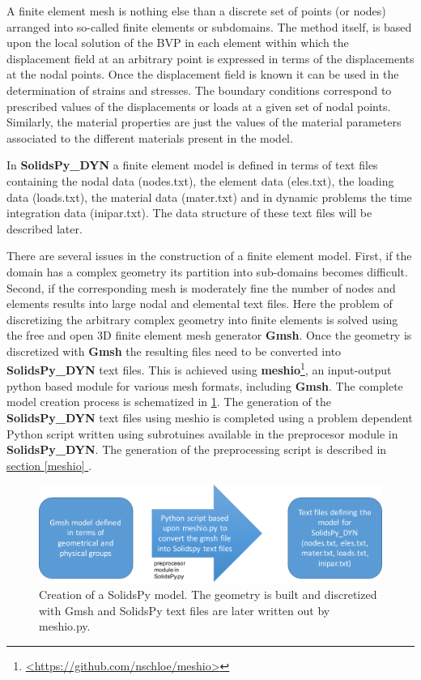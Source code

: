 \documentclass[11pt,letterpaper]{article}
\begin{document}
A finite element mesh is nothing else than a discrete set of points (or nodes) arranged into so-called finite elements or subdomains. The method itself, is based upon the local solution of the BVP in each element within which the displacement field at an arbitrary point is expressed in terms of the displacements at the nodal points. Once the displacement field is known it can be used in the determination of strains and stresses. The boundary conditions correspond to prescribed values of the displacements or loads at a given set of nodal points. Similarly, the material properties are just the values of the material parameters associated to the different materials present in the model.

In {\bf SolidsPy\_DYN} a finite element model is defined in terms of text files containing the nodal data (nodes.txt), the element data (eles.txt), the loading data (loads.txt), the material data (mater.txt) and in dynamic problems the time integration data (inipar.txt). The data structure of these text files will be described later.

There are several issues in the construction of a finite element model. First, if the domain has a complex geometry its partition into sub-domains becomes difficult. Second, if the corresponding mesh is moderately fine the number of nodes and elements results into large nodal and elemental text files. Here the problem of discretizing the arbitrary complex geometry into finite elements is solved using the free and open 3D finite element mesh generator {\bf Gmsh}. Once the geometry is discretized with {\bf Gmsh} the resulting files need to be converted into {\bf SolidsPy\_DYN} text files. This is achieved using {\bf meshio}\footnote{\url{<https://github.com/nschloe/meshio>}}, an input-output python based module for various mesh formats, including {\bf Gmsh}. The complete model creation process is schematized in \cref{fig:modeling}. The generation of the {\bf SolidsPy\_DYN} text files using meshio is completed using a problem dependent Python script written using subrotuines available in the preprocesor module in {\bf SolidsPy\_DYN}. The generation of the preprocessing script is described in \hyperref[meshio]{section \ref*{meshio} }.

\begin{figure}[H]
  \centering
  \includegraphics[width=10 cm]{img/modeling.pdf}
  \caption{Creation of a SolidsPy model. The geometry is built and discretized with Gmsh and SolidsPy text files are later written out by meshio.py.}
  \label{fig:modeling}
\end{figure}
\end{document}

